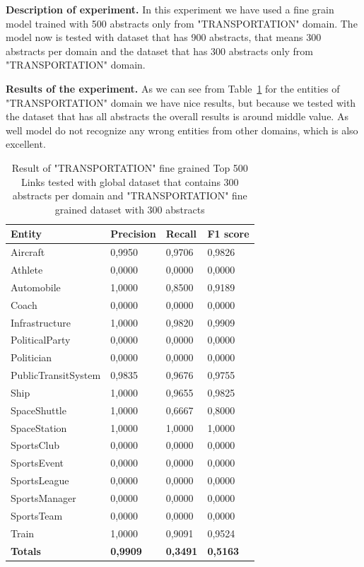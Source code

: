 \documentclass[thesis=M,english]{FITthesis}[2018/05/30]
\begin{document}
\textbf{Description of experiment.} In this experiment we have used a fine grain model trained with 500 abstracts only from "TRANSPORTATION" domain. The model now is tested with dataset that has 900 abstracts, that means 300 abstracts per domain and the dataset that has 300 abstracts only from "TRANSPORTATION" domain.

\textbf{Results of the experiment.} As we can see from Table~\ref{table:Transportation500With2Datasets} for the entities of "TRANSPORTATION" domain we have nice results, but because we tested with the dataset that has all abstracts the overall results is around middle value. As well model do not recognize any wrong entities from other domains, which is also excellent.

	\begin{table}[H]\centering
		\begin{tabular}{|l|l|l|l|}
			\hline {\textbf{Entity}} & {\textbf{Precision}} & {\textbf{Recall}} & {\textbf{F1 score}}\\\hline
				Aircraft & 0,9950 & 0,9706 & 0,9826\\
				Athlete & 0,0000 & 0,0000 & 0,0000\\
				Automobile & 1,0000 & 0,8500 & 0,9189\\ 
				Coach & 0,0000 & 0,0000 & 0,0000\\
				Infrastructure & 1,0000 & 0,9820 & 0,9909\\
				PoliticalParty & 0,0000 & 0,0000 & 0,0000\\
				Politician & 0,0000 & 0,0000 & 0,0000\\
				PublicTransitSystem & 0,9835 & 0,9676 & 0,9755\\
				Ship & 1,0000 & 0,9655 & 0,9825\\
				SpaceShuttle & 1,0000 & 0,6667 & 0,8000\\
				SpaceStation & 1,0000 & 1,0000 & 1,0000\\ 
				SportsClub & 0,0000 & 0,0000 & 0,0000\\
				SportsEvent & 0,0000 & 0,0000 & 0,0000\\
				SportsLeague & 0,0000 & 0,0000 & 0,0000\\
				SportsManager & 0,0000 & 0,0000 & 0,0000\\
				SportsTeam & 0,0000 & 0,0000 & 0,0000\\
				Train & 1,0000 & 0,9091 & 0,9524\\\hline
				\textbf{Totals} & \textbf{0,9909} & \textbf{0,3491} & \textbf{0,5163}\\\hline
		\end{tabular}
		\caption{Result of "TRANSPORTATION" fine grained  Top 500 Links tested with global dataset that contains 300 abstracts per domain and "TRANSPORTATION" fine grained dataset with 300 abstracts \label{table:Transportation500With2Datasets}}
	\end{table}
	
\end{document}
